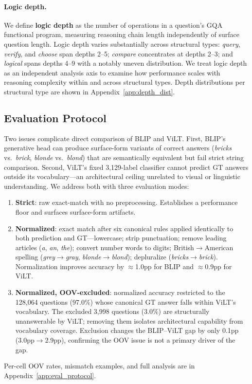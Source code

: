 \documentclass[11pt]{article}
\begin{document}
\paragraph{Logic depth.}
We define \textbf{logic depth} as the number of operations in a question's GQA functional program, measuring reasoning chain length independently of surface question length. Logic depth varies substantially across structural types: \textit{query}, \textit{verify}, and \textit{choose} span depths 2--5; \textit{compare} concentrates at depths 2--3; and \textit{logical} spans depths 4--9 with a notably uneven distribution. We treat logic depth as an independent analysis axis to examine how performance scales with reasoning complexity within and across structural types. Depth distributions per structural type are shown in Appendix~\ref{app:depth_dist}.

\subsection{Evaluation Protocol}
\label{sec:eval}

Two issues complicate direct comparison of BLIP and ViLT. First, BLIP's generative head can produce surface-form variants of correct answers (\emph{bricks} vs.\ \emph{brick}, \emph{blonde} vs.\ \emph{blond}) that are semantically equivalent but fail strict string comparison. Second, ViLT's fixed 3,129-label classifier cannot predict GT answers outside its vocabulary---an architectural ceiling unrelated to visual or linguistic understanding. We address both with three evaluation modes:
\begin{enumerate}[leftmargin=*, topsep=2pt, itemsep=1pt]
  \item \textbf{Strict}: raw exact-match with no preprocessing. Establishes a performance floor and surfaces surface-form artifacts.
  \item \textbf{Normalized}: exact match after six canonical rules applied identically to both prediction and GT---lowercase; strip punctuation; remove leading articles (\emph{a}, \emph{an}, \emph{the}); convert number words to digits; British$\to$American spelling (\emph{grey}$\to$\emph{gray}, \emph{blonde}$\to$\emph{blond}); depluralize (\emph{bricks}$\to$\emph{brick}). Normalization improves accuracy by $\approx$1.0pp for BLIP and $\approx$0.9pp for ViLT.
  \item \textbf{Normalized, OOV-excluded}: normalized accuracy restricted to the 128,064 questions (97.0\%) whose canonical GT answer falls within ViLT's vocabulary. The excluded 3,998 questions (3.0\%) are structurally unanswerable by ViLT; removing them isolates architectural capability from vocabulary coverage. Exclusion changes the BLIP--ViLT gap by only 0.1pp (3.0pp$\to$2.9pp), confirming the OOV issue is not a primary driver of the gap.
\end{enumerate}
Per-cell OOV rates, mismatch examples, and full analysis are in Appendix~\ref{app:eval_protocol}.
\end{document}
